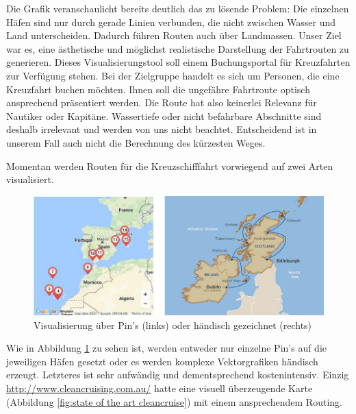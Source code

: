 \documentclass[letterpaper]{article}
\begin{document}
	Die Grafik veranschaulicht bereits deutlich das zu lösende Problem: Die einzelnen Häfen sind nur durch gerade Linien verbunden, die nicht zwischen Wasser und Land unterscheiden. Dadurch führen Routen auch über Landmassen. Unser Ziel war es, eine ästhetische und möglichst realistische Darstellung der Fahrtrouten zu generieren. Dieses Visualisierungstool soll einem Buchungsportal für Kreuzfahrten zur Verfügung stehen. Bei der Zielgruppe handelt es sich um Personen, die eine Kreuzfahrt buchen möchten. Ihnen soll die ungefähre Fahrtroute optisch ansprechend präsentiert werden. Die Route hat also keinerlei Relevanz für Nautiker oder Kapitäne. Wassertiefe oder nicht befahrbare Abschnitte sind deshalb irrelevant und werden von uns nicht beachtet. Entscheidend ist in unserem Fall auch nicht die Berechnung des kürzesten Weges.

	Momentan werden Routen für die Kreuzschifffahrt vorwiegend auf zwei Arten visualisiert.

	\begin{figure}[!htb]
		\begin{center}
		\includegraphics[width=\linewidth]{state_of_the_art}
		\caption{Visualisierung über Pin's (links) oder händisch gezeichnet (rechts)}
		\label{fig:state of the art}
		\end{center}
	\end{figure}

	Wie in Abbildung \ref{fig:state of the art} zu sehen ist, werden entweder nur einzelne Pin's auf die jeweiligen Häfen gesetzt oder es werden komplexe Vektorgrafiken händisch erzeugt. Letzteres ist sehr aufwändig und dementsprechend kostenintensiv. Einzig \url{http://www.cleancruising.com.au/} hatte eine visuell überzeugende Karte (Abbildung \ref{fig:state of the art cleancruise}) mit einem ansprechendem Routing. 
\end{document}

